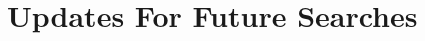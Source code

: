 \begin{comment}
The results for a search for the Higgs Boson in the H→WW→lνjj in pp collisions at √s = 8 TeV 2538 center of mass energy have been presented. This analysis begins with the production of protons in
2539 the LHC accelerator complex, traveling through many complex systems on their way to a collision 2540 at √s = 8 TeV at the center of the CMS detector. The superior tracking and reconstruction of 2541 particles in CMS led to over 19 fb−1 of data collected in 2012 that was used in this analysis.
2542
Once collected, a search was performed for our signal in a final state that included one isolated
2543
lepton, one neutrino (indicated by E
/T ), and two jets. We further required that the jets not be
2544 b-tagged, restricting our sample to light flavor jets that are more common from a W decay. 2545 The search region was divided into categories based on the number of jets in the event, using
2546 categories of 2, 3, or ≥4 jets. For each category we trained a Boosted Decision Tree (BDT) by 2547 using kinematic variables as inputs, with each category optimized for maximum signal extraction 2548 potential. 2549 We looked at two methods for signal extraction, a counting experiment that took advantage 2550 of the BDT by using it as a superior discrimination variable to cut away background, and as 2551 a shape analysis using the entire BDT output shape to separate signal from background. No 2552 significant excess was seen seen using either method, so an upper limit on the production cross 2553 section was placed. Using a counting experiment we set a limit of 16.4 times the standard model, 2554 and using shape based signal extraction we were able to lower this limit to 8.86.

Though this analysis did not have the sensitivity to observe the Higgs directly, I am optimistic
2556 that in the future the increase of data will make this possible. With Run II at the LHC just 2557 beginning, and an increase in the Higgs production cross section at √s = 13 TeV, there will 2558 definitely be more signal out there to find. The increase in luminosity and pileup will require new 2559 and unique ways to reduce the backgrounds seen in this channel, but though careful background 2560 modeling I believe it’s possible.
142
143 2561 Finally, combining this analysis with others looking for the same final state could increase the
2562 sensitivity. Use of Matrix Element values for particle production could serve as a good addition 2563 to the kinematic information of the event, producing a result more sensitive to probing the limits 2564 of the Standard Model.
\end{comment}


\section{Updates For Future Searches}